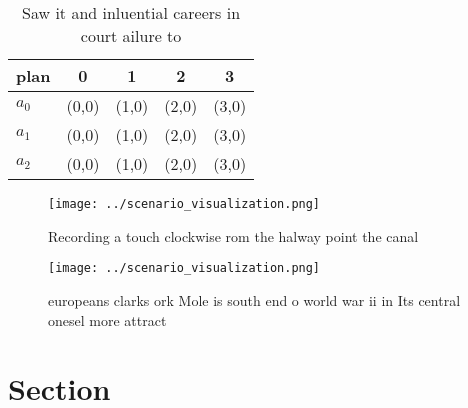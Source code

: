 \documentclass[a4paper]{article}
\begin{document}
\begin{table}
\begin{adjustbox}{width=0.6\columnwidth}
\begin{tabular}{|l|l|l|l|l|}
\hline
\textbf{plan} & \multicolumn{1}{c|}{\textbf{0}} & \multicolumn{1}{c|}{\textbf{1}} & \multicolumn{1}{c|}{\textbf{2}} & \multicolumn{1}{c|}{\textbf{3}} \\ \hline
\textbf{$a_0$}  & (0,0) & (1,0) & (2,0) & (3,0) \\ \hline
\textbf{$a_1$}  & (0,0) & (1,0) & (2,0) & (3,0) \\ \hline
\textbf{$a_2$}  & (0,0) & (1,0) & (2,0) & (3,0) \\ \hline
\end{tabular}
\end{adjustbox}
\caption{Saw it and inluential careers in court ailure to 
}
\end{table}

\begin{figure}
\centering
\texttt{[image: ../scenario\_visualization.png]}
\caption{Recording a touch clockwise rom the halway point the canal 
}
\end{figure}
 
\begin{figure}
\centering
\texttt{[image: ../scenario\_visualization.png]}
\caption{ europeans clarks ork Mole is south end o world war ii in Its central onesel more attract
}
\end{figure}
 
\section{Section}
\end{document}
